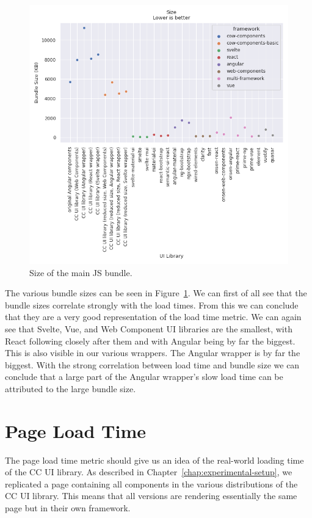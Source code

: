 \begin{figure}[h]
	\includegraphics[width=\columnwidth]{plots/size.png}
	\caption{Size of the main JS bundle.}
	\label{fig:results:size}
	\centering
\end{figure}


The various bundle sizes can be seen in Figure~\ref{fig:results:size}. We can first of all see that the bundle sizes correlate strongly with the load times. From this we can conclude that they are a very good representation of the load time metric. We can again see that Svelte, Vue, and Web Component UI libraries are the smallest, with React following closely after them and with Angular being by far the biggest. This is also visible in our various wrappers. The Angular wrapper is by far the biggest. With the strong correlation between load time and bundle size we can conclude that a large part of the Angular wrapper's slow load time can be attributed to the large bundle size.

\section{Page Load Time}
The page load time metric should give us an idea of the real-world loading time of the CC UI library. As described in Chapter~\ref{chap:experimental-setup}, we replicated a page containing all components in the various distributions of the CC UI library. This means that all versions are rendering essentially the same page but in their own framework.

